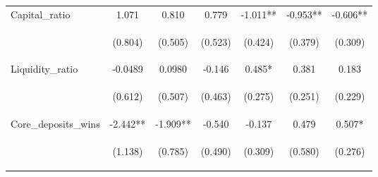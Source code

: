 \documentclass[]{article}
\begin{document}
\begin{center}
\begin{tabular}{lcccccc}
Capital\_ratio & 1.071 & 0.810 & 0.779 & -1.011** & -0.953** & -0.606** \\
\vspace{4pt} & \begin{footnotesize}(0.804)\end{footnotesize} & \begin{footnotesize}(0.505)\end{footnotesize} & \begin{footnotesize}(0.523)\end{footnotesize} & \begin{footnotesize}(0.424)\end{footnotesize} & \begin{footnotesize}(0.379)\end{footnotesize} & \begin{footnotesize}(0.309)\end{footnotesize} \\
Liquidity\_ratio & -0.0489 & 0.0980 & -0.146 & 0.485* & 0.381 & 0.183 \\
\vspace{4pt} & \begin{footnotesize}(0.612)\end{footnotesize} & \begin{footnotesize}(0.507)\end{footnotesize} & \begin{footnotesize}(0.463)\end{footnotesize} & \begin{footnotesize}(0.275)\end{footnotesize} & \begin{footnotesize}(0.251)\end{footnotesize} & \begin{footnotesize}(0.229)\end{footnotesize} \\
Core\_deposits\_wins & -2.442** & -1.909** & -0.540 & -0.137 & 0.479 & 0.507* \\
\vspace{4pt} & \begin{footnotesize}(1.138)\end{footnotesize} & \begin{footnotesize}(0.785)\end{footnotesize} & \begin{footnotesize}(0.490)\end{footnotesize} & \begin{footnotesize}(0.309)\end{footnotesize} & \begin{footnotesize}(0.580)\end{footnotesize} & \begin{footnotesize}(0.276)\end{footnotesize} \\

\end{tabular}
\end{center}
\end{document}

